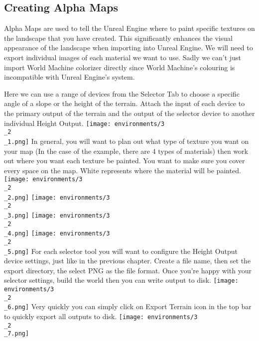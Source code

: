\documentclass[../main.tex]{subfiles}
\begin{document}
\subsection{Creating Alpha Maps}
Alpha Maps are used to tell the Unreal Engine where to paint specific textures on the landscape that you have created. This significantly enhances the visual appearance of the landscape when importing into Unreal Engine. We will need to export individual images of each material we want to use. Sadly we can’t just import World Machine colorizer directly since World Machine’s colouring is incompatible with Unreal Engine’s system.

Here we can use a range of devices from the Selector Tab to choose a specific angle of a slope or the height of the terrain. Attach the input of each device to the primary output of the terrain and the output of the selector device to another individual Height Output.
\texttt{[image: environments/3\\\_2\\\_1.png]}
In general, you will want to plan out what type of texture you want on your map (In the case of the example, there are 4 types of materials) then work out where you want each texture be painted. You want to make sure you cover every space on the map. White represents where the material will be painted.
\texttt{[image: environments/3\\\_2\\\_2.png]}
\texttt{[image: environments/3\\\_2\\\_3.png]}
\texttt{[image: environments/3\\\_2\\\_4.png]}
\texttt{[image: environments/3\\\_2\\\_5.png]}
For each selector tool you will want to configure the Height Output device settings, just like in the previous chapter.
Create a file name, then set the export directory, the select PNG as the file format.
Once you’re happy with your selector settings, build the world then you can write output to disk.
\texttt{[image: environments/3\\\_2\\\_6.png]}
Very quickly you can simply click on Export Terrain icon  in the top bar to quickly export all outputs to disk.
\texttt{[image: environments/3\\\_2\\\_7.png]}
\end{document}
